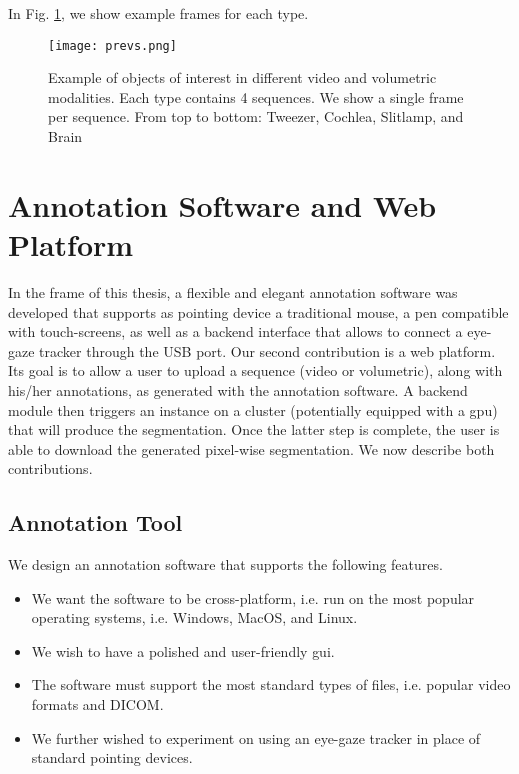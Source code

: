 In Fig. \ref{fig:dset_previews}, we show example frames for each type.

\begin{figure}
\centering
\texttt{[image: prevs.png]}
\caption{Example of objects of interest in different video and volumetric modalities. Each type contains 4 sequences. We show a single frame per sequence.
  From top to bottom: Tweezer, Cochlea, Slitlamp, and Brain}
\label{fig:dset_previews}
\end{figure}


\section{Annotation Software and Web Platform}
In the frame of this thesis, a flexible and elegant annotation software was developed that supports as pointing device a traditional mouse, a pen compatible with touch-screens, as well as a backend interface that allows to connect a eye-gaze tracker through the USB port.
Our second contribution is a web platform.
Its goal is to allow a user to upload a sequence (video or volumetric), along with his/her annotations, as generated with the annotation software.
A backend module then triggers an instance on a cluster (potentially equipped with a \gls{gpu}) that will produce the segmentation.
Once the latter step is complete, the user is able to download the generated pixel-wise segmentation.
We now describe both contributions.

\subsection{Annotation Tool}
\label{sec:anna}

We design an annotation software that supports the following features.

\begin{itemize}
    \item We want the software to be cross-platform, i.e. run on the most popular operating systems, i.e. Windows, MacOS, and Linux.
    \item We wish to have a polished and user-friendly \gls{gui}.
    \item The software must support the most standard types of files, i.e. popular video formats and DICOM.
    \item We further wished to experiment on using an eye-gaze tracker in place of standard pointing devices.
\end{itemize}

